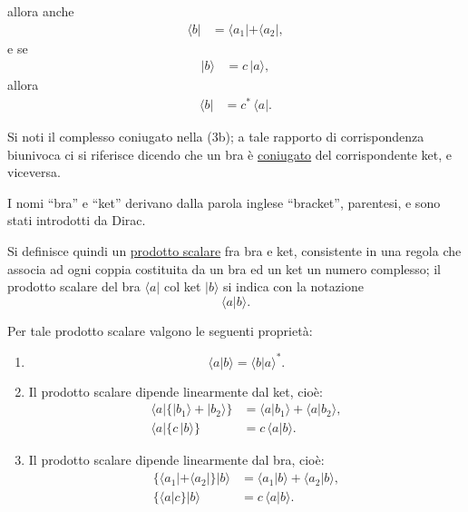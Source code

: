 \documentclass[11pt, a4paper]{book}
\numberwithin{equation}{section}
\begin{document}

allora anche
\begin{align}
\langle b| &= \langle a_1| + \langle a_2|, \tag{2b}
\end{align}
e se
\begin{align}
|b\rangle &= c\,|a\rangle, \tag{3a}
\end{align}
allora
\begin{align}
\langle b| &= c^*\,\langle a|. \tag{3b}
\end{align}

Si noti il complesso coniugato nella (3b); a tale rapporto di
corrispondenza biunivoca ci si riferisce dicendo che un bra è
\uline{coniugato} del corrispondente ket, e viceversa.

I nomi ``bra'' e ``ket'' derivano dalla parola inglese ``bracket'',
parentesi, e sono stati introdotti da Dirac.

Si definisce quindi un \uline{prodotto scalare} fra bra e ket,
consistente in una regola che associa ad ogni coppia costituita da un
bra ed un ket un numero complesso; il prodotto scalare del bra $\langle
a|$ col ket $|b\rangle$ si indica con la notazione
\[
\langle a | b \rangle.
\]

Per tale prodotto scalare valgono le seguenti proprietà:
\begin{enumerate}
  \item
    \begin{equation}
    \langle a | b \rangle = \langle b | a \rangle^*.
    \end{equation}
  \item Il prodotto scalare dipende linearmente dal ket, cioè:
    \begin{align}
    \langle a|\bigl\{|b_1\rangle+|b_2\rangle\bigr\}
      &= \langle a|b_1\rangle + \langle a|b_2\rangle, \tag{5a} \\
    \langle a|\bigl\{c\,|b\rangle\bigr\}
      &= c\,\langle a|b\rangle. \tag{5b}
    \end{align}
  \item Il prodotto scalare dipende linearmente dal bra, cioè:
    \begin{align}
    \bigl\{\langle a_1|+\langle a_2|\bigr\}|b\rangle
      &= \langle a_1|b\rangle+\langle a_2|b\rangle, \tag{6a} \\
    \bigl\{\langle a|c\bigr\}|b\rangle
      &= c\,\langle a|b\rangle. \tag{6b}
    \end{align}
\end{enumerate}
\end{document}

